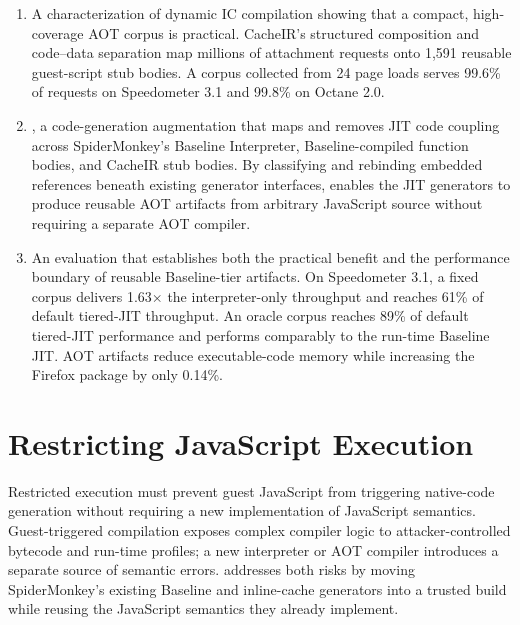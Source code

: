 \documentclass[sigplan,screen,review,anonymous]{acmart}
\newcommand{\tpsixtrain}{24}
\newcommand{\sptrichitrate}{99.6\%}
\newcommand{\spaotdefault}{61\%}
\newcommand{\browserpackagegrowthpct}{0.14\%}
\newcommand{\spaotratio}{1.63$\times$}
\newcommand{\interICtrainCount}{1{,}591}
\newcommand{\oracleDefaultFraction}{89\%}
\newcommand{\AM}{\leavevmode{\sc AmberMonkey}}
\begin{document}
\begin{enumerate}[leftmargin=1.5em,labelsep=0.45em]

  \item A characterization of dynamic IC compilation showing that a
  compact, high-coverage AOT corpus is practical. CacheIR's structured
  composition and code--data separation map millions of attachment
  requests onto \interICtrainCount{} reusable guest-script stub bodies. A corpus
  collected from
  \tpsixtrain{} page loads serves \sptrichitrate{} of requests on Speedometer
  3.1 and 99.8\% on Octane 2.0.

  \item \AM{}, a code-generation augmentation that maps and removes JIT code
  coupling across SpiderMonkey's Baseline Interpreter, Baseline-compiled
  function bodies, and CacheIR stub bodies. By classifying and rebinding
  embedded references beneath existing generator interfaces, \AM{} enables the
  JIT generators to produce reusable AOT artifacts from arbitrary
  JavaScript source without requiring a separate AOT compiler.

  \item An evaluation that establishes both the practical benefit and the
  performance boundary of reusable Baseline-tier artifacts. On Speedometer
  3.1, a fixed corpus delivers \spaotratio{} the interpreter-only throughput
  and reaches \spaotdefault{} of default tiered-JIT throughput. An oracle
  corpus reaches \oracleDefaultFraction{} of default
  tiered-JIT performance and performs comparably to the run-time Baseline JIT.
  AOT artifacts reduce executable-code memory while
  increasing the Firefox package by only \browserpackagegrowthpct{}.

\end{enumerate}

\section{Restricting JavaScript Execution}
\label{sec:complexity}

Restricted execution must prevent guest JavaScript from triggering native-code generation without requiring a new implementation of JavaScript semantics. Guest-triggered compilation exposes complex compiler logic to attacker-controlled bytecode and run-time profiles; a new interpreter or AOT compiler introduces a separate source of semantic errors. \AM{} addresses both risks by moving SpiderMonkey's existing Baseline and inline-cache generators into a trusted build while reusing the JavaScript semantics they already implement.
\end{document}
